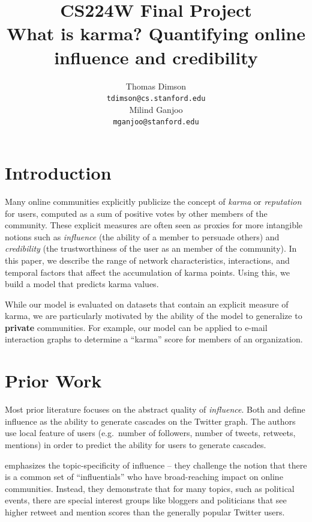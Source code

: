 \documentclass[11pt]{article}
\title{{\small CS224W Final Project} \\ What is karma? Quantifying online influence and credibility}
\author{Thomas Dimson \\
  {\tt tdimson@cs.stanford.edu}
  \\\And
  Milind Ganjoo \\
  {\tt mganjoo@stanford.edu}
}
\date{}
\begin{document}
\maketitle

\newcommand{\citet}[1]{\cite{#1}}

\section{Introduction}
Many online communities explicitly publicize the concept of \textit{karma} or
\textit{reputation} for users, computed as a sum of positive votes by other members of
the community. These explicit measures are often seen as proxies for more
intangible notions such as \textit{influence} (the ability of a member to
persuade others) and \textit{credibility} (the trustworthiness of the user as an
member of the community). In this paper, we describe the range of network
characteristics, interactions, and temporal factors that affect the accumulation
of karma points. Using this, we build a model that predicts karma values.

While our model is evaluated on datasets that contain an explicit
measure of karma, we are particularly motivated by the ability of the
model to generalize to \textbf{private} communities. For example, our model can
be applied to e-mail interaction graphs to determine a ``karma'' score for members
of an organization. 

\section{Prior Work}

Most prior literature focuses on the abstract quality of \textit{influence}.
Both \citet{bakshy2011everyone} and \citet{cha2010measuring} define
influence as the ability to generate cascades on the Twitter graph. The authors
use local feature of users (e.g.\ number of followers, number of tweets,
retweets, mentions) in order to predict the ability for users to generate
cascades.

\citet{cha2010measuring} emphasizes the topic-specificity of influence -- they challenge
the notion that there is a common set of ``influentials'' who have
broad-reaching impact on online communities. Instead, they demonstrate that for
many topics, such as political events, there are special interest groups like
bloggers and politicians that see higher retweet and mention scores than the
generally popular Twitter users.
\end{document}

